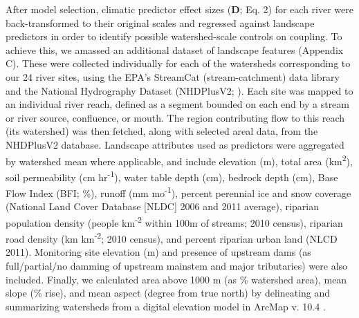 \documentclass[notitlepage]{article}
\begin{document}
After model selection, climatic predictor effect sizes (\textbf{D}; Eq. 2) for each river were back-transformed to their original scales and regressed against landscape predictors in order to identify possible watershed-scale controls on coupling. To achieve this, we amassed an additional dataset of landscape features (Appendix C). These were collected individually for each of the watersheds corresponding to our 24 river sites, using the EPA's StreamCat (stream-catchment) data library \citep{hill2016stream} and the National Hydrography Dataset (NHDPlusV2; \citealt{mckay2012nhdplus}). Each site was mapped to an individual river reach, defined as a segment bounded on each end by a stream or river source, confluence, or mouth. The region contributing flow to this reach (its watershed) was then fetched, along with selected areal data, from the NHDPlusV2 database. Landscape attributes used as predictors were aggregated by watershed mean where applicable, and include elevation (m), total area (km\textsuperscript{2}), soil permeability (cm hr\textsuperscript{-1}), water table depth (cm), bedrock depth (cm), Base Flow Index (BFI; \%), runoff (mm mo\textsuperscript{-1}), percent perennial ice and snow coverage (National Land Cover Database [NLDC] 2006 and 2011 average), riparian population density (people km\textsuperscript{-2} within 100m of streams; 2010 census), riparian road density (km km\textsuperscript{-2}; 2010 census), and percent riparian urban land (NLCD 2011). Monitoring site elevation (m) and presence of upstream dams (as full/partial/no damming of upstream mainstem and major tributaries) were also included. Finally, we calculated area above 1000 m (as \% watershed area), mean slope (\% rise), and mean aspect (degree from true north) by delineating and summarizing watersheds from a digital elevation model in ArcMap v. 10.4 \citep{arcviewenvironmental}.
\end{document}
